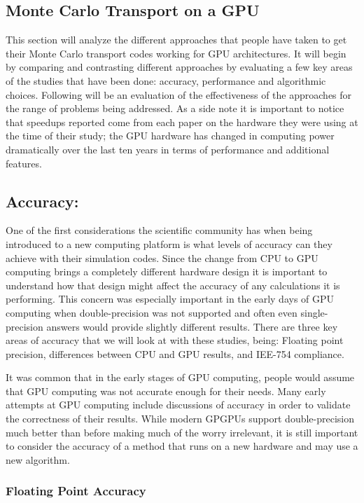 \subsection{ \textbf{Monte Carlo Transport on a GPU}}

This section will analyze the different approaches that people have taken to get their Monte Carlo transport codes working for GPU architectures.
%
It will begin by comparing and contrasting different approaches by evaluating a few key areas of the studies that have been done: accuracy, performance and algorithmic choices.
%
Following will be an evaluation of the effectiveness of the approaches for the range of problems being addressed.
%
As a side note it is important to notice that speedups reported come from each paper on the hardware they were using at the time of their study; the GPU hardware has changed in computing power dramatically over the last ten years in terms of performance and additional features.

\subsection*{ \textbf{Accuracy:} }

One of the first considerations the scientific community has when being introduced to a new computing platform is what levels of accuracy can they achieve with their simulation codes.
%
Since the change from CPU to GPU computing brings a completely different hardware design it is important to understand how that design might affect the accuracy of any calculations it is performing.
%
This concern was especially important in the early days of GPU computing when double-precision was not supported and often even single-precision answers would provide slightly different results.
%
There are three key areas of accuracy that we will look at with these studies, being: Floating point precision, differences between CPU and GPU results, and IEE-754 compliance.
%

%
It was common that in the early stages of GPU computing, people would assume that GPU computing was not accurate enough for their needs.
%
Many early attempts at GPU computing include discussions of accuracy in order to validate the correctness of their results.
%
While modern GPGPUs support double-precision much better than before making much of the worry irrelevant, it is still important to consider the accuracy of a method that runs on a new hardware and may use a new algorithm.
%

\subsubsection*{\textbf{Floating Point Accuracy}}

